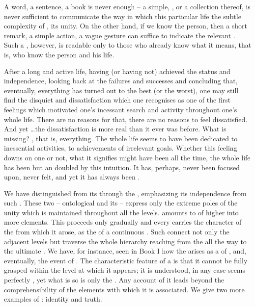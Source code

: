{A word, a sentence, a book is never enough -- a simple, 
, or a collection thereof, is never sufficient to communicate
the way in which this particular life  the subtle
complexity of  , its unity.  On the other
hand, if we know the person, then a short remark, a simple action, a
vague gesture can suffice to indicate the relevant .  Such
a , however, is readable only to those who already know what
it means, that is, who know the person and his life.

\subpa After a long and active life, having (or having not) achieved
the status and independence, looking back at the failures and
successes and concluding that, eventually, everything has turned out
to the best (or the worst), one may still find the disquiet and
dissatisfaction which one recognises as one of the first feelings
which motivated one's incessant search and activity throughout one's
whole life.  There are no reasons for that, there are no 
reasons to feel dissatisfied.  And yet \ldots the dissatisfaction is
more real than it ever was before.  What is missing?  ,
that is, everything.  The whole life seems to have been dedicated to
inessential activities, to achievements of irrelevant goals.  Whether
this feeling downs on one or not, what it signifies might have been
 all the time, the whole life has been but an
 doubled by this  intuition.  It has,
perhaps, never been  focused upon, never 
felt, and yet it has always been .

} %


We have distinguished  from its  through the
, emphasizing its independence from such
. These two -- ontological  and its
 -- express only the extreme poles of the unity which is 
maintained throughout all the levels. 
% 
%
 amounts to  of higher  into more
 elements.  This  proceeds only gradually and every
 carries the character of the  from which it
arose, as the  of a continuous . Such 
connect not only the adjacent levels but traverse the whole hierarchy reaching
from the  all the way to the ultimate . We have, for
instance, seen in Book I how the  arises as a
 of ,  and, eventually, the event of
. The characteristic feature of a  is that it cannot
be fully grasped within the level at which it appears; it is 
understood, in any case seems perfectly , yet what is so
 is only the . Any account of it
leads beyond the comprehensibility of the  elements with which it is
associated. We give two more examples of : identity and truth.

